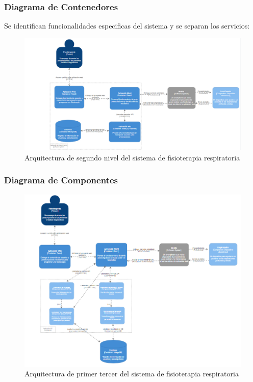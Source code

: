 \documentclass[12pt]{article}
\begin{document}
\subsubsection{Diagrama de Contenedores}
Se identifican funcionalidades especificas del sistema y se separan los servicios:

\begin{figure}[ht]
\centering
\includegraphics[scale=0.5]{imag/L2C4.PNG}
\caption{Arquitectura de segundo nivel del sistema de fisioterapia respiratoria}
\label{5}
\end{figure}
\FloatBarrier

\subsubsection{Diagrama de Componentes}

\begin{figure}[ht]
\centering
\includegraphics[scale=0.6]{imag/L3C4.PNG}
\caption{Arquitectura de primer tercer del sistema de fisioterapia respiratoria}
\label{5}
\end{figure}
\FloatBarrier
\end{document}
